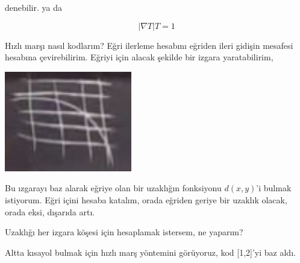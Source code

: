 \documentclass[12pt,fleqn]{article}\usepackage{../../common}
\begin{document}
denebilir. ya da 

$$ |\nabla T| T = 1$$

Hızlı marşı nasıl kodlarım? Eğri ilerleme hesabını eğriden ileri gidişin
mesafesi hesabına çevirebilirim. Eğriyi için alacak şekilde bir izgara
yaratabilirim,

\includegraphics[width=15em]{2_11_07.jpg}

Bu ızgarayı baz alarak eğriye olan bir uzaklığın fonksiyonu $d(x,y)$'i bulmak
istiyorum. Eğri içini hesaba katalım, orada eğriden geriye bir uzaklık olacak,
orada eksi, dışarıda artı.

Uzaklığı her izgara köşesi için hesaplamak istersem, ne yaparım?

Altta kısayol bulmak için hızlı marş yöntemini görüyoruz, kod [1,2]'yi baz aldı. 
\end{document}
